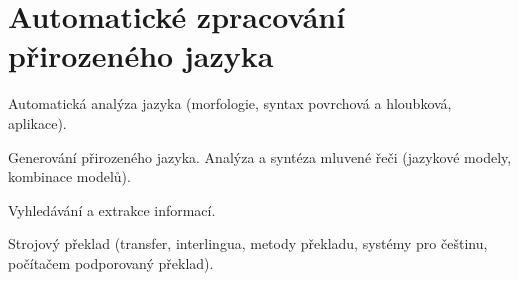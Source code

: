 \newpage
\section{Automatické zpracování přirozeného jazyka}
\begin{pozadavky}
\begin{pitemize}
\item Automatická analýza jazyka (morfologie, syntax povrchová a hloubková, aplikace).
\item Generování přirozeného jazyka.
\itme Analýza a syntéza mluvené řeči (jazykové modely, kombinace modelů).
\item Vyhledávání a extrakce informací.
\item Strojový překlad (transfer, interlingua, metody překladu, systémy pro češtinu, počítačem podporovaný překlad).
\end{pitemize}
\end{pozadavky}